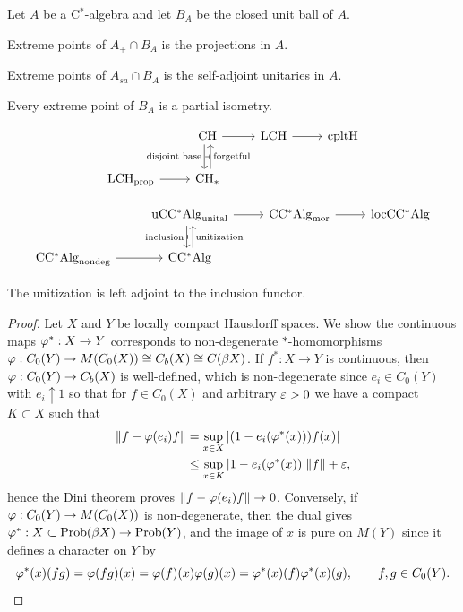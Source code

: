 \documentclass{../../large}
\begin{document}
\begin{prb}
Let $A$ be a C$^*$-algebra and let $B_A$ be the closed unit ball of $A$.
\begin{parts}
\item Extreme points of $A_+\cap B_A$ is the projections in $A$.
\item Extreme points of $A_{sa}\cap B_A$ is the self-adjoint unitaries in $A$.
\item Every extreme point of $B_A$ is a partial isometry.
\end{parts}
\end{prb}


\begin{prb}
\[\begin{tikzcd}
& \mathrm{CH} \rar\dar[shift right, swap]{\text{disjoint base}} &
\mathrm{LCH} \rar &
\mathrm{cpltH} \\
\mathrm{LCH}_{\mathrm{prop}} \rar &
\mathrm{CH}_* \uar[shift right,swap]{\text{forgetful}} \uar[phantom]{\scriptscriptstyle\boldsymbol{\dashv}}
\end{tikzcd}\]

\[\begin{tikzcd}
& \mathrm{uCC^*Alg}_{\mathrm{unital}} \rar\dar[shift right, swap]{\text{inclusion}} &
\mathrm{CC^*Alg}_{\mathrm{mor}} \rar &
\mathrm{locCC^*Alg} \\
\mathrm{CC^*Alg}_{\mathrm{nondeg}} \rar &
\mathrm{CC^*Alg} \uar[shift right,swap]{\text{unitization}} \uar[phantom]{\scriptscriptstyle\boldsymbol{\vdash}}
\end{tikzcd}\]

The unitization is left adjoint to the inclusion functor.
\end{prb}
\begin{proof}
Let $X$ and $Y$ be locally compact Hausdorff spaces.
We show the continuous maps $\varphi^*:X\to Y$ corresponds to non-degenerate $*$-homomorphisms $\varphi:C_0(Y)\to M(C_0(X))\cong C_b(X)\cong C(\beta X)$.
If $f^*:X\to Y$ is continuous, then $\varphi:C_0(Y)\to C_b(X)$ is well-defined, which is non-degenerate since $e_i\in C_0(Y)$ with $e_i\uparrow 1$ so that for $f\in C_0(X)$ and arbitrary $\varepsilon>0$ we have a compact $K\subset X$ such that
\begin{align*}
\|f-\varphi(e_i)f\|
&=\sup_{x\in X}|(1-e_i(\varphi^*(x)))f(x)|\\
&\le\sup_{x\in K}|1-e_i(\varphi^*(x))|\|f\|+\varepsilon,
\end{align*}
hence the Dini theorem proves $\|f-\varphi(e_i)f\|\to0$.
Conversely, if $\varphi:C_0(Y)\to M(C_0(X))$ is non-degenerate, then the dual gives $\varphi^*:X\subset\operatorname{Prob}(\beta X)\to\operatorname{Prob}(Y)$, and the image of $x$ is pure on $M(Y)$ since it defines a character on $Y$ by
\[\varphi^*(x)(fg)=\varphi(fg)(x)=\varphi(f)(x)\varphi(g)(x)=\varphi^*(x)(f)\varphi^*(x)(g),\qquad f,g\in C_0(Y).\]
\end{proof}
\end{document}
